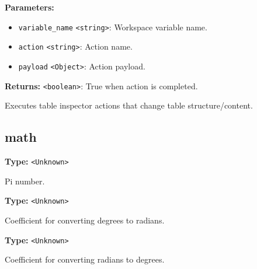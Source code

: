 \documentclass[12pt,a4paper]{article}
\begin{document}
\vspace{5mm}
\noindent {}


\noindent \textbf{Parameters:}
\begin{itemize}
  \item \texttt{variable\_name} \texttt{<string>}: Workspace variable name.
  \item \texttt{action} \texttt{<string>}: Action name.
  \item \texttt{payload} \texttt{<Object>}: Action payload.
\end{itemize}

\noindent \textbf{Returns:} \texttt{<boolean>}: True when action is completed.

\noindent Executes table inspector actions that change table structure/content.


\subsection{math}
\vspace{5mm}
\noindent {}\vspace{4mm}


\noindent \textbf{Type:} \texttt{<Unknown>}

\noindent Pi number.

\vspace{5mm}
\noindent {}\vspace{4mm}


\noindent \textbf{Type:} \texttt{<Unknown>}

\noindent Coefficient for converting degrees to radians.

\vspace{5mm}
\noindent {}\vspace{4mm}


\noindent \textbf{Type:} \texttt{<Unknown>}

\noindent Coefficient for converting radians to degrees.

\vspace{5mm}
\noindent {}\vspace{4mm}
\end{document}
